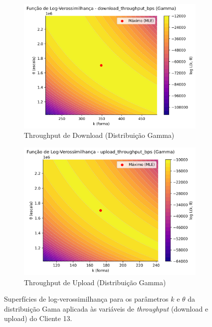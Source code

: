\documentclass{article}
\begin{document}
\begin{figure}[htp]
	\centering
	\begin{subfigure}[b]{0.48\textwidth} %
		\includegraphics[width=\textwidth]{../figures/mle/download_throughput_bps_loglik_surface_gamma_client13.png}
		\caption{Throughput de Download (Distribuição Gamma)}
		\label{fig:download_throughput_bps_loglik_surface_gamma_client13}
	\end{subfigure}
	\hfill 
	\begin{subfigure}[b]{0.48\textwidth}
		\includegraphics[width=\textwidth]{../figures/mle/upload_throughput_bps_loglik_surface_gamma_client13.png}
		\caption{Throughput de Upload (Distribuição Gamma)}
		\label{fig:upload_throughput_bps_loglik_surface_gamma_client13}
	\end{subfigure}
	\caption{Superfícies de log-verossimilhança para os parâmetros $k$ e $\theta$ da distribuição Gama aplicada às variáveis de \textit{throughput} (download e upload) do Cliente 13.}
	\label{fig:throughput_gamma_loglik_combined}
\end{figure}
\end{document}

